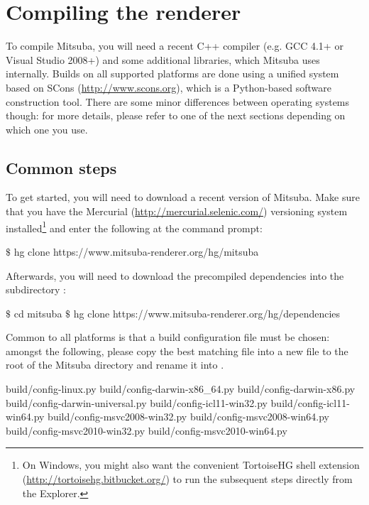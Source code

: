 \section{Compiling the renderer}
To compile Mitsuba, you will need a recent C++ compiler (e.g. GCC 4.1+ or 
Visual Studio 2008+) and some additional libraries, which Mitsuba uses internally. 
Builds on all supported platforms are done using a unified system
based on SCons (\url{http://www.scons.org}), which is a Python-based 
software construction tool. There are some minor differences between operating systems though: for
more details, please refer to one of the next sections depending on which one you use.

\subsection{Common steps}
To get started, you will need to download a recent version of Mitsuba. Make sure that you have the Mercurial (\url{http://mercurial.selenic.com/}) versioning system installed\footnote{On Windows, you might also want the convenient TortoiseHG shell extension (\url{http://tortoisehg.bitbucket.org/}) to run the subsequent steps directly from the Explorer.} and enter the following at the command prompt:
\begin{shell}
$\texttt{\$}$ hg clone https://www.mitsuba-renderer.org/hg/mitsuba
\end{shell}
Afterwards, you will need to download the precompiled dependencies into the
subdirectory :
\begin{shell}
$\texttt{\$}$ cd mitsuba
$\texttt{\$}$ hg clone https://www.mitsuba-renderer.org/hg/dependencies
\end{shell}
Common to all platforms is that a build configuration file must be chosen: amongst the
following, please copy the best matching file into a new file to the root of the Mitsuba
directory and rename it into .
\begin{shell}
build/config-linux.py  
build/config-darwin-x86_64.py  
build/config-darwin-x86.py  
build/config-darwin-universal.py  
build/config-icl11-win32.py  
build/config-icl11-win64.py
build/config-msvc2008-win32.py  
build/config-msvc2008-win64.py
build/config-msvc2010-win32.py  
build/config-msvc2010-win64.py
\end{shell}

